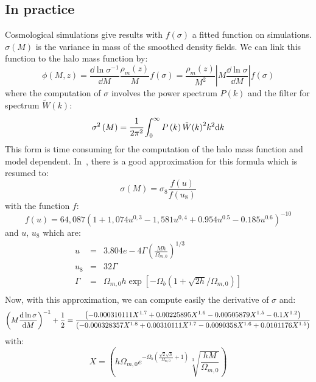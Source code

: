 \subsection{In practice}
%
Cosmological simulations give results with $f\left(\sigma\right)$ a fitted function on
simulations. $\sigma\left({M}\right)$ is the variance in mass of the smoothed density
fields. We can link this function to the halo mass function by:
%
\begin{equation}
    \phi\left({M,z}\right)=\frac{\dd\ln{\sigma^{-1}}}{\dd{M}}\frac{\rho_m\left({z}\right)}{M}{f\left(\sigma\right)}=\frac{\rho_m\left({z}\right)}{M^2}\left|{{M}\frac{\dd\ln\sigma}{\dd{M}}}\right|{f\left(\sigma\right)}
\end{equation}
%
where the computation of $\sigma$ involves the power spectrum $P\left({k}\right)$ and
the filter for spectrum $\tilde{W}\left({k}\right)$:
%
\begin{equation}
    \sigma^2\left({M}\right) =
    \cfrac{1}{2\pi^2}\int_0^\infty{P\left({k}\right)
    \tilde{W}{\left({k}\right)}^2{k^2}{\rm{d}}{k}}
\end{equation}
%
This form is time consuming for the computation of the halo mass function and
model dependent. In~\cite{vandenBosch+02}, there is a good approximation
for this formula which is resumed to:
%
\begin{equation}
    \sigma(M)=\sigma_8\frac{f(u)}{f(u_8)}
\end{equation}
%
with the function $f$:
%
\begin{equation}
    f(u)=64,087{(1+1,074{u^{0,3}}-1,581{u^{0,4}}+0.954{u^{0.5}}-0.185{u^{0.6}})}^{-10}
\end{equation}
%
and $u$, $u_8$ which are:
%
\begin{eqnarray}
    u&=&3.804e-4\Gamma{\left(\frac{Mh}{\Omega_{m,0}}\right)}^{1/3}\nonumber\\
    u_8&=&32\Gamma\nonumber\\
    \Gamma&=&\Omega_{m,0}h\exp\left[{-\Omega_b(1+\sqrt{2h}/\Omega_{m,0})}\right]\nonumber\\
\end{eqnarray}
%
Now, with this approximation, we can compute easily the derivative of $\sigma$
and:
\begin{equation}
    {\left({{M}\frac{{\rm{d}}\ln\sigma}{{\rm{d}}{M}}}\right)}^{-1}+\frac{1}{2} =
    \frac{\left(-0.000310111 X^{1.7}+0.00225895 X^{1.6}-0.00505879 X^{1.5}-0.1 X^{1.2}\right)}{\left(-0.000328357 X^{1.8}+0.00310111 X^{1.7}-0.0090358 X^{1.6}+0.0101176 X^{1.5}\right)}
\end{equation}
%
with:
%
%
\begin{equation}
    X=\left(h \Omega _{m,0} e^{-\Omega _b \left(\frac{\sqrt{2} \sqrt{h}}{\Omega _{m,0}}+1\right)} \sqrt[3]{\frac{h M}{\Omega _{m,0}}}\right)
\end{equation}
